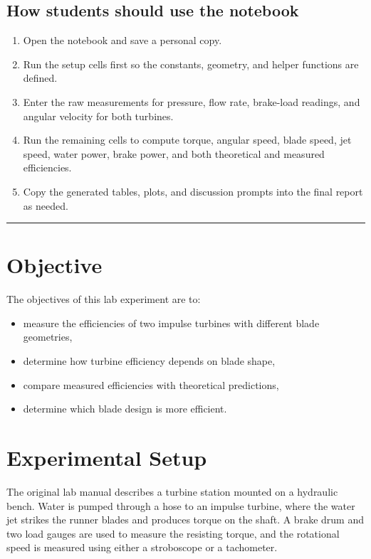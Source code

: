 \documentclass[12pt,letterpaper]{article}
\begin{document}
\subsection*{How students should use the notebook}
\begin{enumerate}[leftmargin=*, label=\arabic*.]
    \item Open the notebook and save a personal copy.
    \item Run the setup cells first so the constants, geometry, and helper functions are defined.
    \item Enter the raw measurements for pressure, flow rate, brake-load readings, and angular velocity for both turbines.
    \item Run the remaining cells to compute torque, angular speed, blade speed, jet speed, water power, brake power, and both theoretical and measured efficiencies.
    \item Copy the generated tables, plots, and discussion prompts into the final report as needed.
\end{enumerate}
\vspace{1em}
\hrule
\vspace{1em}

\section{Objective}
The objectives of this lab experiment are to:
\begin{itemize}[leftmargin=*]
    \item measure the efficiencies of two impulse turbines with different blade geometries,
    \item determine how turbine efficiency depends on blade shape,
    \item compare measured efficiencies with theoretical predictions,
    \item determine which blade design is more efficient.
\end{itemize}

\section{Experimental Setup}
The original lab manual describes a turbine station mounted on a hydraulic bench. Water is pumped through a hose to an impulse turbine, where the water jet strikes the runner blades and produces torque on the shaft. A brake drum and two load gauges are used to measure the resisting torque, and the rotational speed is measured using either a stroboscope or a tachometer.
\end{document}
